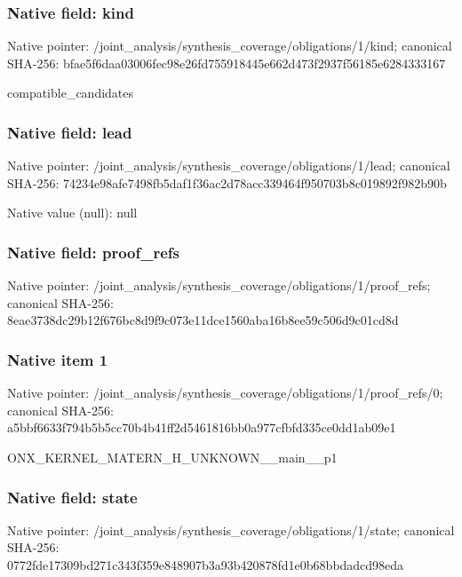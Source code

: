 \documentclass[10pt,a4paper]{article}
\begin{document}
\subsubsection{Native field: kind}
Native pointer: /joint\_\allowbreak{}analysis/synthesis\_\allowbreak{}coverage/obligations/1/kind; canonical SHA-256: bfae5f6daa03006fec98e26fd755918445e662d473f2937f56185e6284333167

\begingroup\raggedright\sloppy compatible\_\allowbreak{}candidates\par\endgroup

\subsubsection{Native field: lead}
Native pointer: /joint\_\allowbreak{}analysis/synthesis\_\allowbreak{}coverage/obligations/1/lead; canonical SHA-256: 74234e98afe7498fb5daf1f36ac2d78acc339464f950703b8c019892f982b90b

Native value (null): null

\subsubsection{Native field: proof\_\allowbreak{}refs}
Native pointer: /joint\_\allowbreak{}analysis/synthesis\_\allowbreak{}coverage/obligations/1/proof\_\allowbreak{}refs; canonical SHA-256: 8eae3738dc29b12f676bc8d9f9c073e11dce1560aba16b8ee59c506d9c01cd8d

\subsubsection{Native item 1}
Native pointer: /joint\_\allowbreak{}analysis/synthesis\_\allowbreak{}coverage/obligations/1/proof\_\allowbreak{}refs/0; canonical SHA-256: a5bbf6633f794b5b5cc70b4b41ff2d5461816bb0a977cfbfd335ce0dd1ab09e1

\begingroup\raggedright\sloppy ONX\_\allowbreak{}KERNEL\_\allowbreak{}MATERN\_\allowbreak{}H\_\allowbreak{}UNKNOWN\_\allowbreak{}\_\allowbreak{}main\_\allowbreak{}\_\allowbreak{}p1\par\endgroup

\subsubsection{Native field: state}
Native pointer: /joint\_\allowbreak{}analysis/synthesis\_\allowbreak{}coverage/obligations/1/state; canonical SHA-256: 0772fde17309bd271c343f359e848907b3a93b420878fd1e0b68bbdadcd98eda
\end{document}
